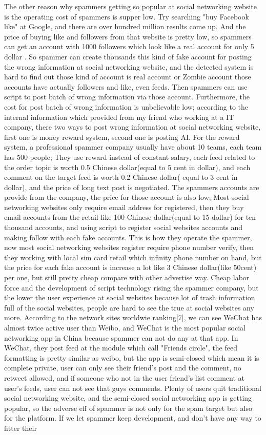 \documentclass[sigconf]{acmart}
\begin{document}
The other reason why spammers getting so popular at social networking website is the operating cost of spammers is supper low. Try searching "buy Facebook like" at Google, and there are over hundred million results come up. And the price of buying like and followers from that website is pretty low, so spammers can get an account with 1000 followers which look like a real account for only 5 dollar \cite{buy:01}. So spammer can create thousands this kind of fake account for posting the wrong information at social networking website, and the detected system is hard to find out those kind of account is real account or Zombie account those accounts have actually followers and like, even feeds. Then spammers can use script to post batch of wrong information via those account. Furthermore, the cost for post batch of wrong information is unbelievable low; according to the internal information which provided from my friend who working at a IT company, there two ways to post wrong information at social networking website, first one is money reward system, second one is posting AI. For the reward system, a professional spammer company usually have about 10 teams, each team has 500 people; They use reward instead of constant salary, each feed related to the order topic is worth 0.5 Chinese dollar(equal to 5 cent in dollar), and each comment on the target feed is worth  0.2 Chinese dollar( equal to 3 cent in dollar), and the price of long text post is negotiated. The spammers accounts are provide from the company, the price for those account is also low; Most social networking websites only require email address for registered, then they buy email accounts from the retail like 100 Chinese dollar(equal to 15 dollar) for ten thousand accounts, and using script to register social websites accounts and making follow with each fake accounts. This is how they operate the spammer, now most social networking websites register require phone number verify, then they working with local sim card retail which infinity phone number on hand, but the price for each fake account is increase a lot like 3 Chinese dollar(like 50cent) per one, but still pretty cheap compare with other advertise way. Cheap labor force and the development of script technology rising the spammer company, but the lower the user experience at social websites because lot of trash information full of the social websites, people are hard to see the true at social websites any more. According to the network sites worldwie ranking[7], we can see WeChat has almost twice active user than Weibo, and WeChat is the most popular social networking app in China because spammer can not do any at that app. In WeChat, they post feed at the module which call "Friends circle", the feed formatting is pretty similar as weibo, but the app is semi-closed which mean it is complete private, user can only see their friend's post and the comment, no retweet allowed, and if someone who not in the user friend's list comment at user's feeds, user can not see that guys comments. Plenty of users quit traditional social networking website, and the semi-closed social networking app is getting popular, so the adverse eff of spammer is not only for the spam target but also for the platform. If we let spammer keep development, and don't have any way to fitter their 
\end{document}
